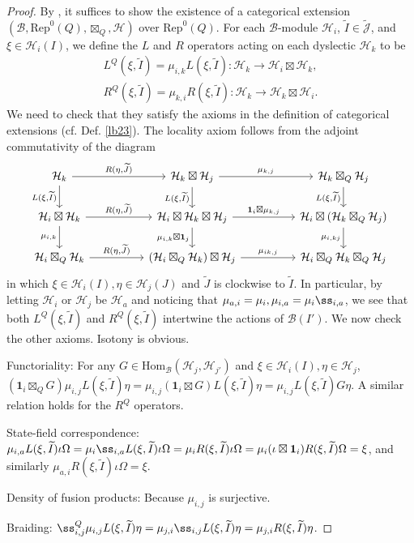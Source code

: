 \documentclass[12pt,a4paper,notitlepage]{article}
\theoremstyle{definition}
\theoremstyle{plain}
\newcommand{\mc}{\mathcal}
\newcommand{\wtd}{\widetilde}
\newcommand{\id}{\mathbf{1}}
\newcommand{\Hom}{\mathrm{Hom}}
\newcommand{\Rep}{\mathrm{Rep}}
\newcommand{\Jtd}{\widetilde{\mathcal J}}
\numberwithin{equation}{section}
\begin{document}
\begin{proof}
By \cite[Thm. 3.10]{Gui21a}, it suffices to show the existence of a categorical extension $(\mc B,\Rep^0(Q),\boxtimes_Q,\mc H)$ over $\Rep^0(Q)$. For each $\mc B$-module $\mc H_i$, $\wtd I\in\Jtd$, and $\xi\in\mc H_i(I)$, we define the $L$ and $R$ operators acting on each dyslectic $\mc H_k$ to be
\begin{gather*}
L^Q(\xi,\wtd I)=\mu_{i,k} L(\xi,\wtd I):\mc H_k\rightarrow\mc H_i\boxtimes\mc H_k,\\
R^Q(\xi,\wtd I)=\mu_{k,i}R(\xi,\wtd I):\mc H_k\rightarrow\mc H_k\boxtimes\mc H_i.
\end{gather*}
We need to check that they satisfy the axioms in the definition of categorical extensions (cf. Def. \ref{lb23}). The locality axiom follows from the adjoint commutativity of the diagram
\begin{equation}
	\begin{tikzcd}
\mc H_k\arrow[rr,"{R(\eta,\wtd J)}"]\arrow[d,"{L(\xi,\wtd I)}"'] &&\mc H_k\boxtimes\mc H_j\arrow[rr,"\mu_{k,j}"]\arrow[d,"{L(\xi,\wtd I)}"']&&\mc H_k\boxtimes_Q\mc H_j\arrow[d,"{L(\xi,\wtd I)}"']\\
		\mc H_i\boxtimes\mc H_k\arrow[rr,"{R(\eta,\wtd J)}"]\arrow[d,"\mu_{i,k}"']&&\mc H_i\boxtimes\mc H_k\boxtimes\mc H_j\arrow[rr,"\id_i\boxtimes\mu_{k,j}"]\arrow[d,"\mu_{i,k}\boxtimes\id_j"']&&\mc H_i\boxtimes(\mc H_k\boxtimes_Q\mc H_j)\arrow[d,"\mu_{i,kj}"']\\
		\mc H_i\boxtimes_Q\mc H_k\arrow[rr,"{R(\eta,\wtd J)}"]&&\mc(	\mc H_i\boxtimes_Q\mc H_k)\boxtimes\mc H_j\arrow[rr,"\mu_{ik,j}"]&&\mc H_i\boxtimes_Q\mc H_k\boxtimes_Q\mc H_j 
	\end{tikzcd}
\end{equation}
in which $\xi\in\mc H_i(I),\eta\in\mc H_j(J)$ and $\wtd J$ is clockwise to $\wtd I$. In particular, by letting $\mc H_i$ or $\mc H_j$ be $\mc H_a$ and noticing that $\mu_{a,i}=\mu_i,\mu_{i,a}=\mu_i\ss_{i,a}$, we see that both $L^Q(\xi,\wtd I)$ and $R^Q(\xi,\wtd I)$ intertwine the actions of $\mc B(I')$. We now check the other axioms. Isotony is obvious.

Functoriality: For any $G\in\Hom_{\mc B}(\mc H_j,\mc H_{j'})$ and $\xi\in\mc H_i(I),\eta\in\mc H_j$, $(\id_i\boxtimes_Q G)\mu_{i,j}L(\xi,\wtd I)\eta=\mu_{i,j}(\id_i\boxtimes G)L(\xi,\wtd I)\eta=\mu_{i,j}L(\xi,\wtd I)G\eta$. A similar relation holds for the $R^Q$ operators.

State-field correspondence: $\mu_{i,a}L(\xi,\wtd I)\iota\Omega=\mu_i\ss_{i,a}L(\xi,\wtd I)\iota\Omega=\mu_i R(\xi,\wtd I)\iota\Omega=\mu_i(\iota\boxtimes\id_i)R(\xi,\wtd I)\Omega=\xi$, and similarly $\mu_{a,i}R(\xi,\wtd I)\iota \Omega=\xi$.

Density of fusion products: Because $\mu_{i,j}$ is surjective.

Braiding: $\ss^Q_{i,j}\mu_{i,j}L(\xi,\wtd I)\eta=\mu_{j,i}\ss_{i,j}L(\xi,\wtd I)\eta=\mu_{j,i}R(\xi,\wtd I)\eta$.
\end{proof}
\end{document}
